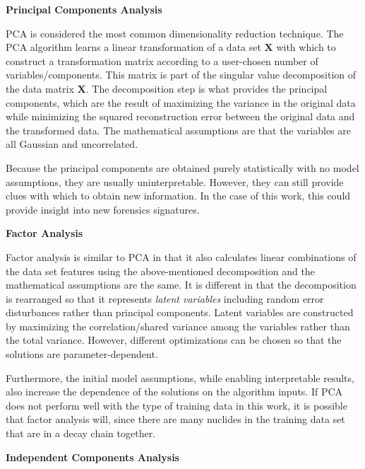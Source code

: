 \vspace{5mm} \noindent \textbf{Principal Components Analysis} \vspace{5mm}

\Gls{PCA} is considered the most common dimensionality reduction technique.
The \gls{PCA} algorithm learns a linear transformation of a data set
$\boldsymbol{X}$ with which to construct a transformation matrix according to a
user-chosen number of variables/components.  This matrix is part of the
singular value decomposition of the data matrix $\boldsymbol{X}$.  The
decomposition step is what provides the principal components, which are the
result of maximizing the variance in the original data while minimizing the
squared reconstruction error between the original data and the transformed
data. The mathematical assumptions are that the variables are all Gaussian and
uncorrelated.

Because the principal components are obtained purely statistically with no
model assumptions, they are usually uninterpretable. However, they can still
provide clues with which to obtain new information. In the case of this work,
this could provide insight into new forensics signatures.

\vspace{5mm} \noindent \textbf{Factor Analysis} \vspace{5mm}

Factor analysis is similar to \gls{PCA} in that it also calculates linear
combinations of the data set features using the above-mentioned decomposition
and the mathematical assumptions are the same.  It is different in that the
decomposition is rearranged so that it represents \textit{latent variables}
including random error disturbances rather than principal components.  Latent
variables are constructed by maximizing the correlation/shared variance among
the variables rather than the total variance.  However, different optimizations
can be chosen so that the solutions are parameter-dependent.  

Furthermore, the initial model assumptions, while enabling interpretable
results, also increase the dependence of the solutions on the algorithm inputs.
If \gls{PCA} does not perform well with the type of training data in this work,
it is possible that factor analysis will, since there are many nuclides in the
training data set that are in a decay chain together.

\vspace{5mm} \noindent \textbf{Independent Components Analysis} \vspace{5mm}

